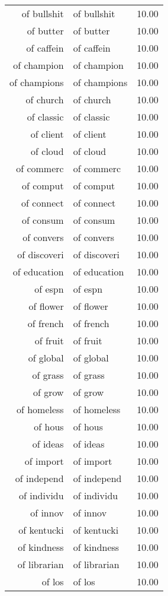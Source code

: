 \begin{table}[ht]
\begin{tabular}{rlr}
  of bullshit & of bullshit & 10.00 \\ 
  of butter & of butter & 10.00 \\ 
  of caffein & of caffein & 10.00 \\ 
  of champion & of champion & 10.00 \\ 
  of champions & of champions & 10.00 \\ 
  of church & of church & 10.00 \\ 
  of classic & of classic & 10.00 \\ 
  of client & of client & 10.00 \\ 
  of cloud & of cloud & 10.00 \\ 
  of commerc & of commerc & 10.00 \\ 
  of comput & of comput & 10.00 \\ 
  of connect & of connect & 10.00 \\ 
  of consum & of consum & 10.00 \\ 
  of convers & of convers & 10.00 \\ 
  of discoveri & of discoveri & 10.00 \\ 
  of education & of education & 10.00 \\ 
  of espn & of espn & 10.00 \\ 
  of flower & of flower & 10.00 \\ 
  of french & of french & 10.00 \\ 
  of fruit & of fruit & 10.00 \\ 
  of global & of global & 10.00 \\ 
  of grass & of grass & 10.00 \\ 
  of grow & of grow & 10.00 \\ 
  of homeless & of homeless & 10.00 \\ 
  of hous & of hous & 10.00 \\ 
  of ideas & of ideas & 10.00 \\ 
  of import & of import & 10.00 \\ 
  of independ & of independ & 10.00 \\ 
  of individu & of individu & 10.00 \\ 
  of innov & of innov & 10.00 \\ 
  of kentucki & of kentucki & 10.00 \\ 
  of kindness & of kindness & 10.00 \\ 
  of librarian & of librarian & 10.00 \\ 
  of los & of los & 10.00 \\ 

\end{tabular}
\end{table}
